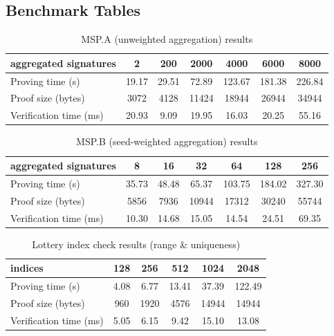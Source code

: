\documentclass{article}
\begin{document}
\subsection{Benchmark Tables}

\begin{table}[htbp]
  \centering
  \caption{MSP.A (unweighted aggregation) results}
  \renewcommand{\arraystretch}{0.9}
  \setlength{\tabcolsep}{10pt}
  \begin{tabular}{lcccccc}
    \toprule
    \textbf{aggregated signatures} & \textbf{2} & \textbf{200} & \textbf{2000} & \textbf{4000} & \textbf{6000} & \textbf{8000} \\
    \midrule
    Proving time (s)     & 19.17 & 29.51 & 72.89 & 123.67 & 181.38 & 226.84 \\
    Proof size (bytes)   & 3072  & 4128  & 11424 & 18944  & 26944  & 34944  \\
    Verification time (ms) & 20.93 & 9.09  & 19.95 & 16.03  & 20.25  & 55.16  \\
    \bottomrule
  \end{tabular}
  \label{tab:mspa_benchmark_en}
\end{table}


\begin{table}[htbp]
  \centering
  \caption{MSP.B (seed-weighted aggregation) results}
  \renewcommand{\arraystretch}{0.9}
  \setlength{\tabcolsep}{10pt}
  \begin{tabular}{lcccccc}
    \toprule
    \textbf{aggregated signatures} & \textbf{8} & \textbf{16} & \textbf{32} & \textbf{64} & \textbf{128} & \textbf{256} \\
    \midrule
    Proving time (s)     & 35.73 & 48.48 & 65.37 & 103.75 & 184.02 & 327.30 \\
    Proof size (bytes)   & 5856  & 7936  & 10944 & 17312  & 30240  & 55744  \\
    Verification time (ms) & 10.30 & 14.68 & 15.05 & 14.54 & 24.51  & 69.35  \\
    \bottomrule
  \end{tabular}
  \label{tab:mspb_benchmark_en}
\end{table}


\begin{table}[htbp]
  \centering
  \caption{Lottery index check results (range \& uniqueness)}
  \renewcommand{\arraystretch}{0.9}
  \setlength{\tabcolsep}{10pt}
  \begin{tabular}{lccccc}
    \toprule
    \textbf{indices} & \textbf{128} & \textbf{256} & \textbf{512} & \textbf{1024} & \textbf{2048} \\
    \midrule
    Proving time (s)     & 4.08 & 6.77  & 13.41 & 37.39 & 122.49 \\
    Proof size (bytes)   & 960  & 1920  & 4576  & 14944 & 14944 \\
    Verification time (ms) & 5.05 & 6.15 & 9.42  & 15.10 & 13.08 \\
    \bottomrule
  \end{tabular}
  \label{tab:index_check_benchmark_en}
\end{table}
\end{document}
